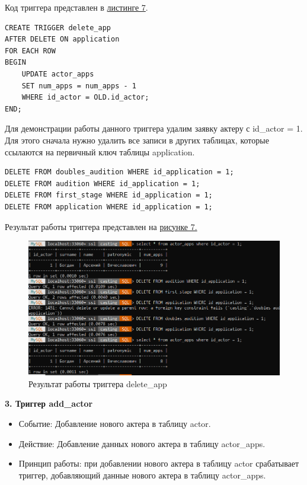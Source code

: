 \documentclass[11pt,a4paper,final]{article} %
\begin{document}
Код триггера представлен в \hyperref[lst:l7]{листинге 7}.
\newpage

\begin{lstlisting}[caption={Код триггера add\_app}, label=lst:l7]
CREATE TRIGGER delete_app
AFTER DELETE ON application
FOR EACH ROW
BEGIN
	UPDATE actor_apps
	SET num_apps = num_apps - 1
	WHERE id_actor = OLD.id_actor;
END;
\end{lstlisting}


Для демонстрации работы данного триггера удалим заявку актеру с id\_actor = 1. Для этого сначала нужно удалить все записи в других таблицах, которые ссылаются на первичный ключ таблицы application.

\begin{lstlisting}
DELETE FROM doubles_audition WHERE id_application = 1; 
DELETE FROM audition WHERE id_application = 1; 
DELETE FROM first_stage WHERE id_application = 1;
DELETE FROM application WHERE id_application = 1; 
\end{lstlisting}


Результат работы триггера представлен на \hyperref[fig:pic7]{рисунке 7.}

\begin{figure}[H]
	\centering
	\includegraphics[width=1.0\linewidth]{pic7.png}
	\caption{Результат работы триггера delete\_app}
	\label{fig:pic7}
\end{figure}





\textbf{3. Триггер add\_actor}
\begin{itemize}
	\item Событие: Добавление нового актера в таблицу actor.
	\item Действие: Добавление данных нового актера в таблицу actor\_apps.
	\item Принцип работы: при добавлении нового актера в таблицу actor срабатывает триггер, добавляющий данные нового актера в таблицу actor\_apps.
\end{itemize}
\end{document}
